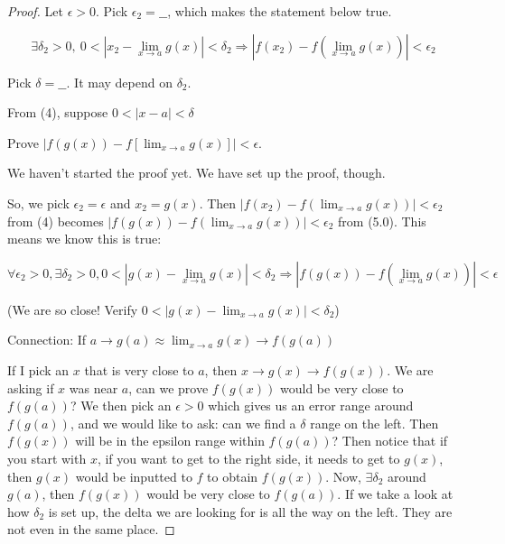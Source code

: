 \documentclass[12pt]{article}
\theoremstyle{plain}
\theoremstyle{remark}
\theoremstyle{definition}
\begin{document}
\begin{proof} Let \(\epsilon > 0\). Pick \(\epsilon_{2} = \_\_\), which
makes the statement below true.

\[\exists\delta_{2} > 0,\ 0 < \left| x_{2} - \lim_{x \rightarrow a}{g(x)} \right| < \delta_{2} \Rightarrow \left| f\left( x_{2} \right) - f\left( \lim_{x \rightarrow a}{g(x)} \right) \right| < \epsilon_{2}\  \]

Pick \(\delta = \_\_\). It may depend on \(\delta_{2}\).

From (4), suppose \(0 < |x - a| < \delta\)

Prove
\(\left| f\left( g(x) \right) - f\left\lbrack \lim_{x \rightarrow a}{g(x)} \right\rbrack \right| < \epsilon\).

We haven't started the proof yet. We have set up the proof, though.

So, we pick \(\epsilon_{2} = \epsilon\) and \(x_{2} = g(x)\). Then
\(\left| f\left( x_{2} \right) - f\left( \lim_{x \rightarrow a}{g(x)} \right) \right| < \epsilon_{2}\)
from (4) becomes
\(\left| f\left( g(x) \right) - f\left( \lim_{x \rightarrow a}{g(x)} \right) \right| < \epsilon_{2}\)
from (5.0). This means we know this is true:

\[\forall\epsilon_{2} > 0,\exists\delta_{2} > 0,0 < \left| g(x) - \lim_{x \rightarrow a}{g(x)} \right| < \delta_{2} \Rightarrow \left| f\left( g(x) \right) - f\left( \lim_{x \rightarrow a}{g(x)} \right) \right| < \epsilon\  \]

(We are so close! Verify
\(0 < \left| g(x) - \lim_{x \rightarrow a}{g(x)} \right| < \delta_{2}\))

Connection: If
\(a \rightarrow g(a) \approx \lim_{x \rightarrow a}{g(x)} \rightarrow f\left( g(a) \right)\)

If I pick an \(x\) that is very close to \(a\), then
\(x \rightarrow g(x) \rightarrow f\left( g(x) \right)\). We are asking
if \(x\) was near \(a\), can we prove \(f\left( g(x) \right)\) would be
very close to \(f\left( g(a) \right)\)? We then pick an \(\epsilon > 0\)
which gives us an error range around \(f\left( g(a) \right)\), and we
would like to ask: can we find a \(\delta\) range on the left. Then
\(f\left( g(x) \right)\) will be in the epsilon range within
\(f\left( g(a) \right)\)? Then notice that if you start with \(x\), if
you want to get to the right side, it needs to get to \(g(x)\), then
\(g(x)\) would be inputted to \(f\) to obtain \(f\left( g(x) \right)\).
Now, \(\exists\delta_{2}\) around \(g(a)\), then
\(f\left( g(x) \right)\) would be very close to
\(f\left( g(a) \right)\). If we take a look at how \(\delta_{2}\) is set
up, the delta we are looking for is all the way on the left. They are
not even in the same place.



\end{proof}
\end{document}
